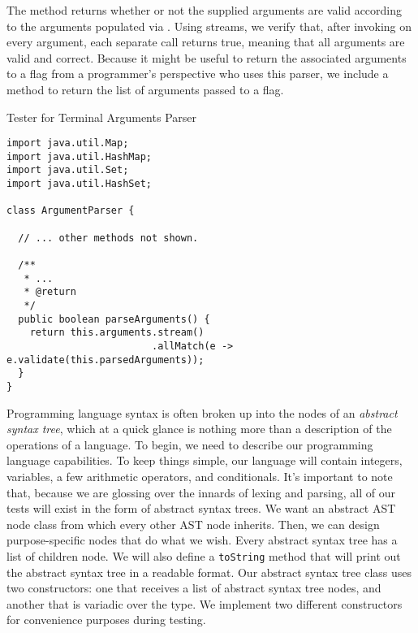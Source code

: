 The  method returns whether or not the supplied arguments are valid according to the arguments populated via . Using streams, we verify that, after invoking  on every argument, each separate call returns true, meaning that all arguments are valid and correct. Because it might be useful to return the associated arguments to a flag from a programmer's perspective who uses this parser, we include a  method to return the list of arguments passed to a flag.

\begin{cl}[]{Tester for Terminal Arguments Parser}
\begin{lstlisting}[language=MyJava]
import java.util.Map;
import java.util.HashMap;
import java.util.Set;
import java.util.HashSet;

class ArgumentParser {
  
  // ... other methods not shown.

  /**
   * ... 
   * @return
   */
  public boolean parseArguments() {
    return this.arguments.stream()
                         .allMatch(e -> e.validate(this.parsedArguments));
  }
}
\end{lstlisting}
\end{cl}


Programming language syntax is often broken up into the nodes of an \emph{abstract syntax tree}, which at a quick glance is nothing more than a description of the operations of a language. To begin, we need to describe our programming language capabilities. To keep things simple, our language will contain integers, variables, a few arithmetic operators, and conditionals. It's important to note that, because we are glossing over the innards of lexing and  parsing, all of our tests will exist in the form of abstract syntax trees. We want an abstract AST node class from which every other AST node inherits. Then, we can design purpose-specific nodes that do what we wish. Every abstract syntax tree has a list of children node. We will also define a \texttt{toString} method that will print out the abstract syntax tree in a readable format. Our abstract syntax tree class uses two constructors: one that receives a list of abstract syntax tree nodes, and another that is variadic over the  type. We implement two different constructors for convenience purposes during testing.

